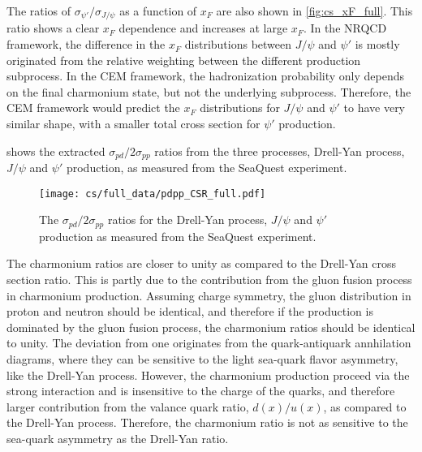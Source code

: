 \documentclass[../main.tex]{subfiles}
\begin{document}
The ratios of $\sigma_{\psi'}/\sigma_{J/\psi}$ as a function of $x_F$ are also shown in \cref{fig:cs_xF_full}.
This ratio shows a clear $x_F$ dependence and increases at large $x_F$. In the NRQCD framework,
the difference in the $x_F$ distributions between $J/\psi$ and $\psi'$ is mostly originated
from the relative weighting between the different production subprocess.
In the CEM framework, the hadronization probability only depends on
the final charmonium state, but not the underlying subprocess. Therefore, the CEM framework would predict
the $x_F$ distributions for $J/\psi$ and $\psi'$ to have very similar shape, with a smaller total cross section
for $\psi'$ production.

 shows the extracted $\sigma_{pd}/2\sigma_{pp}$ ratios from the three processes,
Drell-Yan process, $J/\psi$ and $\psi'$ production, as measured from the SeaQuest experiment.
\begin{figure}[h!]
	\centering
	\texttt{[image: cs/full\_data/pdpp\_CSR\_full.pdf]}
	\caption{The $\sigma_{pd}/2\sigma_{pp}$ ratios for the Drell-Yan process, $J/\psi$ and $\psi'$ production
		as measured from the SeaQuest experiment.
	}
	\label{fig:csr_all_process}
\end{figure}
The charmonium ratios are closer to unity as compared to the Drell-Yan cross section ratio. This
is partly due to the contribution from the gluon fusion process in charmonium production. Assuming
charge symmetry, the gluon distribution in proton and neutron should be identical, and therefore
if the production is dominated by the gluon fusion process, the charmonium ratios should be identical
to unity. The deviation from one originates from the quark-antiquark annhilation diagrams, where they
can be sensitive to the light sea-quark flavor asymmetry, like the Drell-Yan process. However, the charmonium
production proceed via the strong interaction and is insensitive to the charge of the quarks, and therefore
larger contribution from the valance quark ratio, $d(x)/u(x)$, as compared to the Drell-Yan process. Therefore,
the charmonium ratio is not as sensitive to the sea-quark asymmetry as the Drell-Yan ratio.


\FloatBarrier
\end{document}
